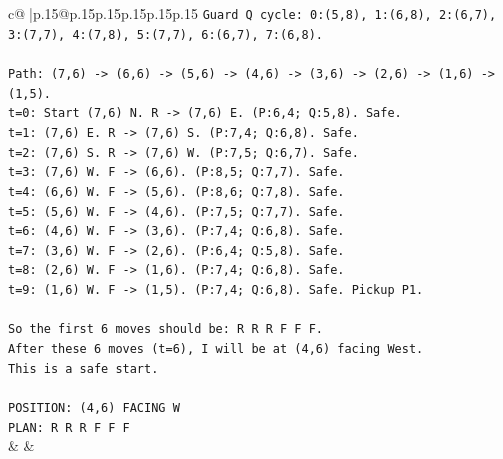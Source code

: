 \documentclass{article}
\begin{document}
{\begin{supertabular}{c@{$\;$}|p{.15\linewidth}@{}p{.15\linewidth}p{.15\linewidth}p{.15\linewidth}p{.15\linewidth}p{.15\linewidth}}
{{{\texttt{Guard Q cycle: 0:(5,8), 1:(6,8), 2:(6,7), 3:(7,7), 4:(7,8), 5:(7,7), 6:(6,7), 7:(6,8).} \\
\\ 
\texttt{Path: (7,6) {-}> (6,6) {-}> (5,6) {-}> (4,6) {-}> (3,6) {-}> (2,6) {-}> (1,6) {-}> (1,5).} \\
\texttt{t=0: Start (7,6) N. R {-}> (7,6) E. (P:6,4; Q:5,8). Safe.} \\
\texttt{t=1: (7,6) E. R {-}> (7,6) S. (P:7,4; Q:6,8). Safe.} \\
\texttt{t=2: (7,6) S. R {-}> (7,6) W. (P:7,5; Q:6,7). Safe.} \\
\texttt{t=3: (7,6) W. F {-}> (6,6). (P:8,5; Q:7,7). Safe.} \\
\texttt{t=4: (6,6) W. F {-}> (5,6). (P:8,6; Q:7,8). Safe.} \\
\texttt{t=5: (5,6) W. F {-}> (4,6). (P:7,5; Q:7,7). Safe.} \\
\texttt{t=6: (4,6) W. F {-}> (3,6). (P:7,4; Q:6,8). Safe.} \\
\texttt{t=7: (3,6) W. F {-}> (2,6). (P:6,4; Q:5,8). Safe.} \\
\texttt{t=8: (2,6) W. F {-}> (1,6). (P:7,4; Q:6,8). Safe.} \\
\texttt{t=9: (1,6) W. F {-}> (1,5). (P:7,4; Q:6,8). Safe. Pickup P1.} \\
\\ 
\texttt{So the first 6 moves should be: R R R F F F.} \\
\texttt{After these 6 moves (t=6), I will be at (4,6) facing West.} \\
\texttt{This is a safe start.} \\
\\ 
\texttt{POSITION: (4,6) FACING W} \\
\texttt{PLAN: R R R F F F} \\
            }
        }
    }
    & & \\ \\


\end{supertabular}}
\end{document}
